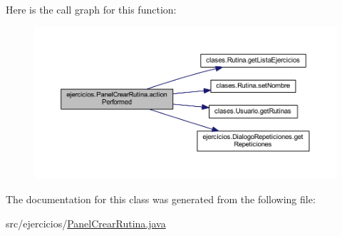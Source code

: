 Here is the call graph for this function\+:
\nopagebreak
\begin{figure}[H]
\begin{center}
\leavevmode
\includegraphics[width=350pt]{classejercicios_1_1_panel_crear_rutina_a4e2ad610b1b2be17aafd6fb490aac55f_cgraph}
\end{center}
\end{figure}


The documentation for this class was generated from the following file\+:\begin{DoxyCompactItemize}
\item 
src/ejercicios/\mbox{\hyperlink{_panel_crear_rutina_8java}{Panel\+Crear\+Rutina.\+java}}\end{DoxyCompactItemize}
